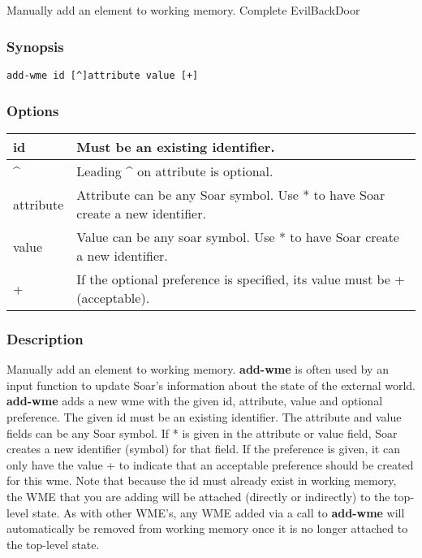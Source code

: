 \subsection{}
\label{add-wme}
Manually add an element to working memory. 
 Complete EvilBackDoor
\subsubsection*{Synopsis}
  \begin{verbatim}
add-wme id [^]attribute value [+]
\end{verbatim}
\subsubsection*{Options}
\begin{tabular}{|l|l|}
\hline 
 id  & Must be an existing identifier.  \\
 \hline 
 \^{}  & Leading \^{} on attribute is optional.  \\
 \hline 
 attribute  & Attribute can be any Soar symbol. Use * to have Soar create a new identifier.  \\
 \hline 
 value  & Value can be any soar symbol. Use * to have Soar create a new identifier.  \\
 \hline 
 +  & If the optional preference is specified, its value must be + (acceptable).  \\
 \hline 
\end{tabular}
\subsubsection*{Description}
 Manually add an element to working memory. \textbf{add-wme}
 is often used by an input function to update Soar's information about the state of the external world. 
 \textbf{add-wme}
 adds a new wme with the given id, attribute, value and optional preference. The given id must be an existing identifier. The attribute and value fields can be any Soar symbol. If * is given in the attribute or value field, Soar creates a new identifier (symbol) for that field. If the preference is given, it can only have the value + to indicate that an acceptable preference should be created for this wme. 
 Note that because the id must already exist in working memory, the WME that you are adding will be attached (directly or indirectly) to the top-level state. As with other WME's, any WME added via a call to \textbf{add-wme}
 will automatically be removed from working memory once it is no longer attached to the top-level state. 
